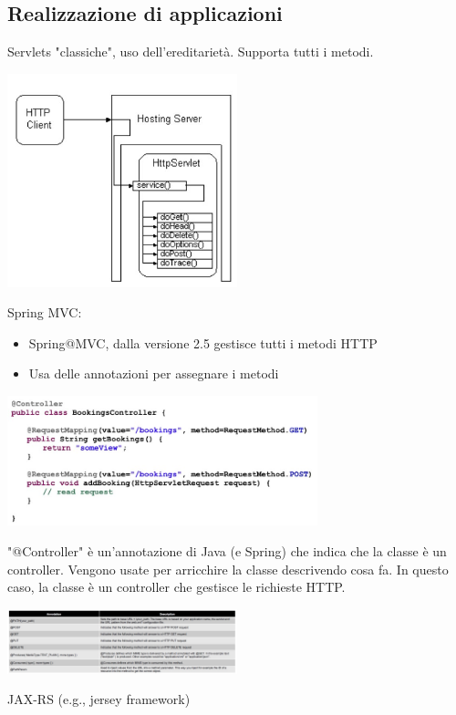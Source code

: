 \subsection{Realizzazione di applicazioni}
Servlets "classiche", uso dell'ereditarietà. Supporta tutti i metodi.
\begin{center}
    \includegraphics[width=0.5\textwidth]{img/appWeb11.jpg}
\end{center}
Spring MVC:
\begin{itemize}
    \item Spring@MVC, dalla versione 2.5 gestisce tutti i metodi HTTP
    \item Usa delle annotazioni per assegnare i metodi
\end{itemize}
\begin{center}
    \includegraphics[width=0.675\textwidth]{img/appWeb12.jpg}
\end{center}
"@Controller" è un'annotazione di Java (e Spring) che indica che la classe è un controller. Vengono usate per arricchire la classe descrivendo cosa fa. In questo caso, la classe è un controller che gestisce le richieste HTTP.
\begin{center}
    \includegraphics[width=0.5\textwidth]{img/appWeb13.jpg}
\end{center}
JAX-RS (e.g., jersey framework)
